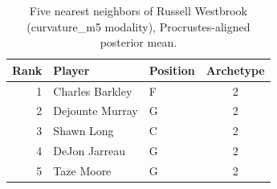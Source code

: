 \begin{table}[htbp]
  \centering\small
  \begin{tabular}{rllc}
    \toprule
    Rank & Player & Position & Archetype \\
    \midrule
    1 & Charles Barkley & F & 2 \\
    2 & Dejounte Murray & G & 2 \\
    3 & Shawn Long & C & 2 \\
    4 & DeJon Jarreau & G & 2 \\
    5 & Taze Moore & G & 2 \\
    \bottomrule
  \end{tabular}
  \caption{Five nearest neighbors of Russell Westbrook (curvature_m5 modality), Procrustes-aligned posterior mean.}
  \label{tab:Russell_Westbrook_neighbors_curvature_m5}
\end{table}

